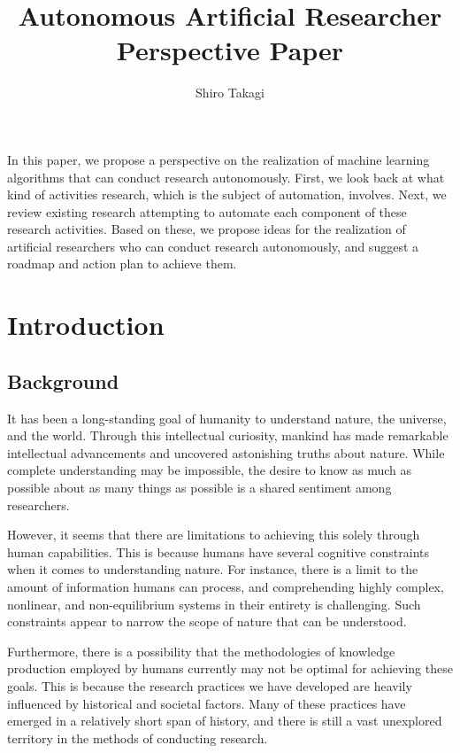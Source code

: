 \documentclass{book}
\title{Autonomous Artificial Researcher Perspective Paper}
\author{Shiro Takagi}
\newenvironment{abstract}{}{}
\begin{document}
\sloppy
\maketitle
\tableofcontents

\begin{abstract}
    In this paper, we propose a perspective on the realization of machine learning algorithms that can conduct research autonomously. First, we look back at what kind of activities research, which is the subject of automation, involves. Next, we review existing research attempting to automate each component of these research activities. Based on these, we propose ideas for the realization of artificial researchers who can conduct research autonomously, and suggest a roadmap and action plan to achieve them.
\end{abstract}

\chapter{Introduction}

\section{Background}
It has been a long-standing goal of humanity to understand nature, the universe, and the world. Through this intellectual curiosity, mankind has made remarkable intellectual advancements and uncovered astonishing truths about nature. While complete understanding may be impossible, the desire to know as much as possible about as many things as possible is a shared sentiment among researchers.

However, it seems that there are limitations to achieving this solely through human capabilities. This is because humans have several cognitive constraints when it comes to understanding nature. For instance, there is a limit to the amount of information humans can process, and comprehending highly complex, nonlinear, and non-equilibrium systems in their entirety is challenging. Such constraints appear to narrow the scope of nature that can be understood.

Furthermore, there is a possibility that the methodologies of knowledge production employed by humans currently may not be optimal for achieving these goals. This is because the research practices we have developed are heavily influenced by historical and societal factors. Many of these practices have emerged in a relatively short span of history, and there is still a vast unexplored territory in the methods of conducting research.
\end{document}
